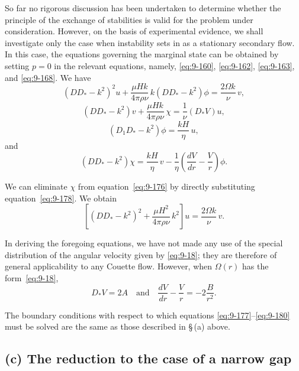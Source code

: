So far no rigorous discussion has been undertaken to determine whether the principle of the exchange of stabilities is valid for the problem under consideration. However, on the basis of experimental evidence, we shall investigate only the case when instability sets in as a stationary secondary flow. In this case, the equations governing the marginal state can be obtained by setting $p = 0$ in the relevant equations, namely, \eqref{eq:9-160}, \eqref{eq:9-162}, \eqref{eq:9-163}, and \eqref{eq:9-168}. We have
\begin{equation}
(DD_* - k^2)^2 u + \frac{\mu Hk}{4\pi\rho\nu}\, k (DD_* - k^2)\phi = \frac{2\Omega k}{\nu}\, v, \label{eq:9-176}
\end{equation}
\begin{equation}
(DD_* - k^2)v + \frac{\mu Hk}{4\pi\rho\nu}\, \chi = \frac{1}{\nu}(D_*V)u, \label{eq:9-177}
\end{equation}
\begin{equation}
(D_1D_* - k^2)\phi = \frac{kH}{\eta}\, u, \label{eq:9-178}
\end{equation}
and
\begin{equation}
(DD_* - k^2)\chi = \frac{kH}{\eta}\, v - \frac{1}{\eta}\left(\frac{dV}{dr} - \frac{V}{r}\right)\phi. \label{eq:9-179}
\end{equation}

We can eliminate $\chi$ from equation~\eqref{eq:9-176} by directly substituting equation~\eqref{eq:9-178}. We obtain
\begin{equation}
\left[(DD_* - k^2)^2 + \frac{\mu H^2}{4\pi\rho\nu}\, k^2\right] u = \frac{2\Omega k}{\nu}\, v. \label{eq:9-180}
\end{equation}

In deriving the foregoing equations, we have not made any use of the special distribution of the angular velocity given by \eqref{eq:9-18}; they are therefore of general applicability to any Couette flow. However, when $\Omega(r)$ has the form~\eqref{eq:9-18},
\begin{equation}
D_*V = 2A \quad \text{and} \quad \frac{dV}{dr} - \frac{V}{r} = -2\frac{B}{r^2}. \label{eq:9-181}
\end{equation}

The boundary conditions with respect to which equations \eqref{eq:9-177}--\eqref{eq:9-180} must be solved are the same as those described in \S\,(a) above.

\subsection*{(c) The reduction to the case of a narrow gap}

